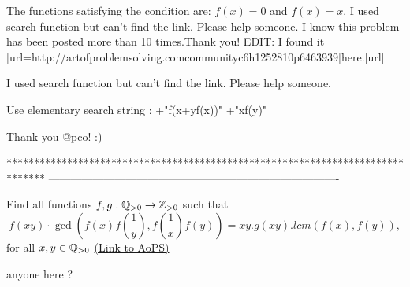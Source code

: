 \begin{solution}
	The functions satisfying the condition are:
$f(x)=0$ and $f(x)=x$.
I used search function but can't find the link. Please help someone. I know this problem has been posted more than 10 times.Thank you!
EDIT: I found it [url=http://artofproblemsolving.com\/community\/c6h1252810p6463939]here.[\/url]
\end{solution}



\begin{solution}
	\begin{tcolorbox}I used search function but can't find the link. Please help someone. \end{tcolorbox}
Use elementary search string : +"f(x+yf(x))" +"xf(y)"


\end{solution}



\begin{solution}
	Thank you @pco! :)
\end{solution}
*******************************************************************************
-------------------------------------------------------------------------------

\begin{problem}
	Find all functions $f,g : \Bbb{Q}_{>0}\to \Bbb{Z}_{>0}$ such that $$f(xy)\cdot \gcd\left( f(x)f(\frac{1}{y}), f(\frac{1}{x})f(y)\right)
= xy.g(xy).lcm(f(x),f(y)),$$ for all $x, y \in  \Bbb{Q}_{>0}$
	\flushright \href{https://artofproblemsolving.com/community/c6h1614944}{(Link to AoPS)}
\end{problem}



\begin{solution}
	anyone here ?
\end{solution}



